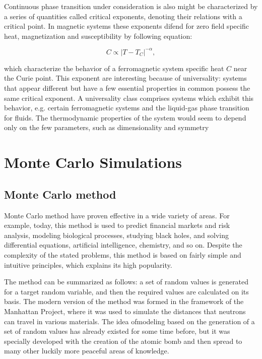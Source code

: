 Continuous phase transition under consideration is also might be characterized by a series of quantities called critical exponents, denoting their relations with a critical point. In magnetic systems these exponents difend for zero field specific heat, magnetization and susceptibility by following equation:

\begin{equation}
C \propto |T-T_C|^{-\alpha},
\end{equation}

which characterize the behavior of a ferromagnetic system specific heat $C$ near the Curie point. This exponent are interesting because of universality: systems that appear different but have a few essential properties in common possess the same critical exponent.
A universality class comprises systems which exhibit this behavior, e.g. certain ferromagnetic systems and the liquid-gas phase transition for fluids. The thermodynamic properties of the system would seem to depend only on the few parameters, such as dimensionality and symmetry

\section{Monte Carlo Simulations}\label{section: Monte Carlo method}

\subsection{Monte Carlo method}
Monte Carlo method have proven effective in a wide variety of areas. For example, today, this method is used to predict financial markets and risk analysis, modeling biological processes, studying black holes, and solving differential equations, artificial intelligence, chemistry, and so on.  Despite the complexity of the stated problems, this method is based on fairly simple and intuitive principles, which explains its high popularity.

The method can be summarized as follows: a set of random values ​​is generated for a target random variable, and then the required values ​​are calculated on its basis. The modern version of the method was formed in the framework of the Manhattan Project, where it was used to simulate the distances that neutrons can travel in various materials. The idea of ​​modeling based on the generation of a set of random values ​​has already existed for some time before, but it was specially developed with the creation of the atomic bomb and then spread to many other luckily more peaceful areas of knowledge.


